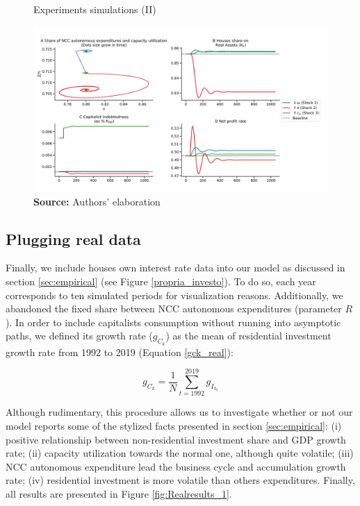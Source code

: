 \documentclass[11pt]{article}
\begin{document}
\begin{figure}[htb]
	\centering
	\caption{Experiments simulations (II)}
	\label{fig:results_2}
	\includegraphics[width=.8\textwidth]{./figs/Compared_Shocks_2.png}
	\caption*{\textbf{Source:} Authors' elaboration}
\end{figure}



\subsection{Plugging real data}
\label{sec:orgf4cd550}
\label{real_sim}

Finally, we include houses own interest rate data into our model as discussed in section \ref{sec:empirical} (see Figure \ref{propria_investo}).
To do so, each year corresponds to ten simulated periods for visualization reasons.
Additionally, we abandoned the fixed share between NCC autonomous expenditures (parameter \(R\)).
In order to include capitalists consumption without running into asymptotic paths, we defined its growth rate (\(g_{C_k}\)) as the mean of residential investment growth rate from 1992 to 2019 (Equation \ref{gck_real}):

\begin{equation}
  \label{gck_real}
  g_{C_k} = \frac{1}{N} \sum_{t=1992}^{2019} g_{I_{h_{t}}}
\end{equation}


Although rudimentary, this procedure allows us to investigate whether or not our model reports some of the stylized facts presented in section \ref{sec:empirical}:
(i) positive relationship between non-residential investment share and GDP growth rate; (ii) capacity utilization towards the normal one, although quite volatile; (iii) NCC autonomous expenditure lead the business cycle and accumulation growth rate; (iv) residential investment is more volatile than others expenditures.
Finally, all results are presented in Figure \ref{fig:Realresults_1}.
\end{document}
